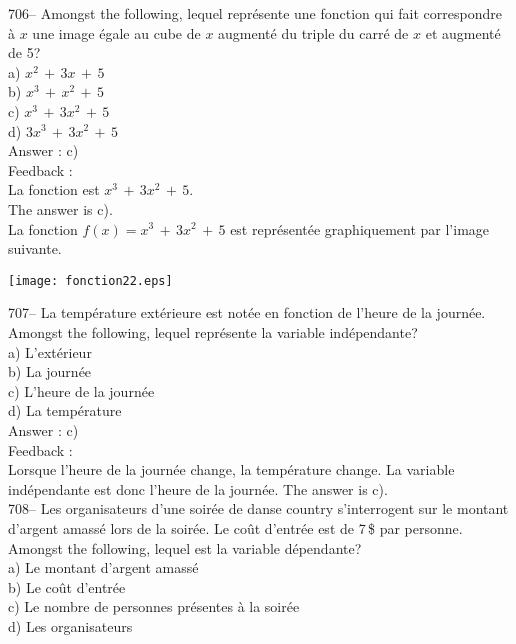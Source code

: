\documentclass[letterpaper, 12pt]{article}
\begin{document}
706-- Amongst the following, lequel repr\'esente une fonction qui
fait correspondre \`a $x$ une image \'egale au cube de $x$ augment\'e du
triple du carr\'e de $x$ et augment\'e de 5?\\
a) $x^{2}\,+\,3x \,+\,5$\\
b) $x^{3}\,+\,x^{2}\,+\,5$\\
c) $x^{3}\,+\,3x^{2}\,+\,5$\\
d) $3x^{3}\,+\,3x^{2}\,+\,5$\\

Answer : c)\\

Feedback : \\
La fonction est $x^{3}\,+\,3x^{2}\,+\,5$.\\
The answer is c).\\
La fonction $f(x)=x^{3}\,+\,3x^{2}\,+\,5$ est repr\'esent\'ee graphiquement
par l'image suivante.  \\
    \begin{center}
    \texttt{[image: fonction22.eps]}
    \end{center}


707-- La temp\'erature ext\'erieure est not\'ee en fonction de l'heure de la
journ\'ee.  Amongst the following, lequel repr\'esente la variable
ind\'ependante?\\
a) L'ext\'erieur\\
b) La journ\'ee\\
c) L'heure de la journ\'ee\\
d) La temp\'erature\\

Answer :  c)\\

Feedback : \\
Lorsque l'heure de la journ\'ee change, la temp\'erature change.  La
variable ind\'ependante est donc l'heure de la journ\'ee.  The answer is
c).\\

708-- Les organisateurs d'une soir\'ee de danse country s'interrogent sur le
montant d'argent amass\'e lors de la soir\'ee.  Le co\^ut d'entr\'ee est de
7\,\$ par personne.  Amongst the following, lequel est la variable
d\'ependante?\\
a) Le montant d'argent amass\'e\\
b) Le co\^ut d'entr\'ee\\
c) Le nombre de personnes pr\'esentes \`a la soir\'ee\\
d) Les organisateurs\\
\end{document}
